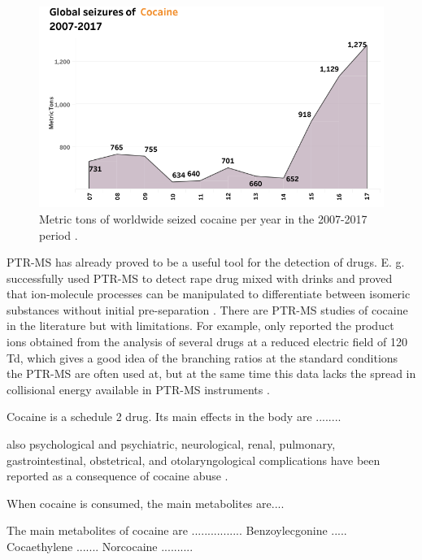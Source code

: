 \begin{figure}[ht]
\centering
\includegraphics[width=0.8\linewidth]{pics/cocaine-chapter/UN_coc.png}
\caption{Metric tons  of worldwide seized cocaine per year in the 2007-2017 period \cite{united2019world}.}
\label{fig:coc_UN}
\end{figure}

PTR-MS has already proved to be a useful tool for the detection of drugs. 
%
E. g. 
\citeauthor{doi:10.1002/jms.2993} successfully  used PTR-MS to detect rape drug mixed with drinks  and \citeauthor{lanza2013distinguishing} proved that ion-molecule processes can be manipulated to differentiate between isomeric substances without initial pre-separation \cite{doi:10.1002/jms.2993,lanza2013distinguishing}.
%
%
There are PTR-MS studies of cocaine in the literature but with limitations. 
%
For example,  \citeauthor{Agarwal2011} only reported the product ions obtained from the analysis of several drugs at a reduced electric field of 120 Td, which gives a good idea of the branching ratios at the standard conditions the PTR-MS are often used at, but at the same time this data lacks the spread in collisional energy available in PTR-MS instruments \cite{Agarwal2011}.



Cocaine is a schedule 2 drug. 
Its main effects in the body are ........

\cite{lange2001cardiovascular}

also psychological and psychiatric, neurological, renal, pulmonary, gastrointestinal, obstetrical, and otolaryngological complications have been reported as a consequence of cocaine abuse \cite{glauser2007overview}.

When cocaine is consumed, the main metabolites are....

The main metabolites of cocaine are ................ 
Benzoylecgonine ..... 
Cocaethylene ....... 
Norcocaine .......... 

